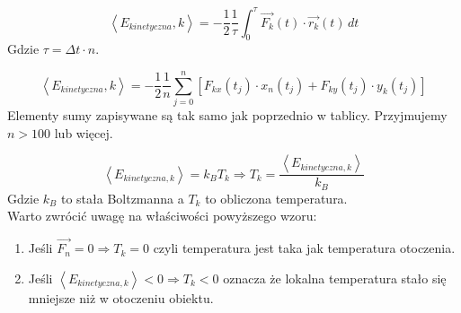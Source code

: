 \documentclass[12pt, letterpaper]{report}
\begin{document}
    \begin{equation}
        \left< E_{kinetyczna} , k \right> = 
        -\frac{1}{2} \frac{1}{\tau} \int_{0}^{\tau} \vec{F_k}(t) \cdot \vec{r_k}(t) \, dt
    \end{equation}
    Gdzie $\tau = \Delta t \cdot n$.

    \begin{equation}
        \left< E_{kinetyczna} , k \right> = 
        -\frac{1}{2} \frac{1}{n} \sum_{j = 0}^{n} \left[  F_{kx}(t_j) \cdot x_n(t_j) + F_{ky}(t_j) \cdot y_k(t_j) \right]
    \end{equation}
    Elementy sumy zapisywane są tak samo jak poprzednio w tablicy. Przyjmujemy $n > 100$ lub więcej. 

    \begin{equation}
        \left< E_{kinetyczna, k} \right> = k_B T_k \Rightarrow T_k = \frac{\left< E_{kinetyczna, k} \right>}{k_B}
    \end{equation}
    Gdzie $k_B$ to stała Boltzmanna a $T_k$ to obliczona temperatura. \\

    Warto zwrócić uwagę na właściwości powyższego wzoru:
    \begin{enumerate}
        \item Jeśli $\vec{F_n} = 0 \Rightarrow T_k = 0$ czyli temperatura jest taka jak temperatura otoczenia.
        \item Jeśli $\left< E_{kinetyczna, k} \right> < 0 \Rightarrow T_k < 0$ oznacza że lokalna 
        temperatura stało się mniejsze niż w otoczeniu obiektu.
    \end{enumerate}
\end{document}
